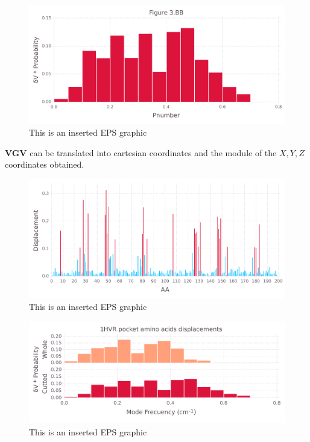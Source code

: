 \documentclass[10pt,letterpaper]{article}
\begin{document}
\begin{figure}[ht]
\begin{center}
\includegraphics[scale=0.5]{1hvr_apo/3bbfigure.pdf}
\caption{This is an inserted EPS graphic}
\label{fig11}
\end{center}
\end{figure}

\FloatBarrier


\textbf{VGV} can be translated into cartesian coordinates and the module of the \(X, Y, Z\) coordinates obtained.

\begin{figure}[ht]
\begin{center}
\includegraphics[scale=0.5]{1hvr_apo/5figure.pdf}
\caption{This is an inserted EPS graphic}
\label{fig13}
\end{center}
\end{figure}

\begin{figure}[ht]
\begin{center}
\includegraphics[scale=0.5]{1hvr_apo/3_both.pdf}
\caption{This is an inserted EPS graphic}
\label{fig13}
\end{center}
\end{figure}
\end{document}
